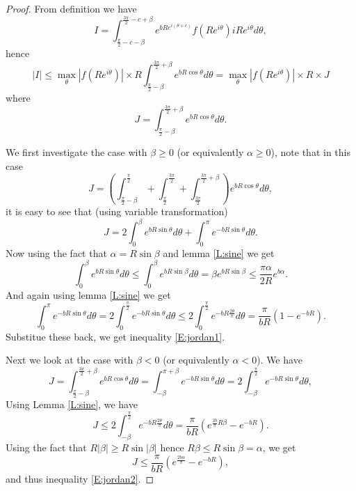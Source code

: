\begin{proof}
From definition we have
\[
  I=\int_{\frac{\pi}{2}-c-\beta}^{\frac{3\pi}{2}-c+\beta}
    e^{bRe^{i(\theta+c)}} f(Re^{i\theta}) iRe^{i\theta} d\theta,
\]
hence
\[
  |I| \le \max_{\theta}|f(Re^{i\theta})| \times R
          \int_{\frac{\pi}{2}-\beta}^{\frac{3\pi}{2}+\beta}
            e^{bR\cos{\theta}} d\theta
      = \max_{\theta}|f(Re^{i\theta})| \times R \times J
\]
where 
\[
  J= \int_{\frac{\pi}{2}-\beta}^{\frac{3\pi}{2}+\beta}
       e^{bR\cos{\theta}} d\theta.
\]

We first investigate the case with $\beta\ge0$ (or equivalently
$\alpha\ge 0$), note that in this case
\[
  J=\left( 
      \int_{\frac{\pi}{2}-\beta}^{\frac{\pi}{2}}
      + \int_{\frac{\pi}{2}}^{\frac{3\pi}{2}}
      + \int_{\frac{3\pi}{2}}^{\frac{3\pi}{2}+\beta}
    \right)
    e^{bR\cos{\theta}} d\theta,
\]
it is easy to see that (using variable transformation)
\[
  J= 2\int_0^{\beta} e^{bR\sin{\theta}} d\theta
      + \int_0^{\pi} e^{-bR\sin{\theta}} d\theta.
\]
Now using the fact that $\alpha=R\sin{\beta}$ and lemma \ref{L:sine} we get
\[
  \int_0^{\beta} e^{bR\sin{\theta}} d\theta
  \le \int_0^{\beta} e^{bR\sin{\beta}} d\theta
  = \beta e^{bR\sin{\beta}} \le \frac{\pi\alpha}{2R} e^{b\alpha}.
\]
And again using lemma \ref{L:sine} we get
\[
  \int_0^{\pi} e^{-bR\sin{\theta}} d\theta
  = 2\int_0^{\frac{\pi}{2}} e^{-bR\sin{\theta}} d\theta
  \le 2\int_0^{\frac{\pi}{2}} e^{-bR\frac{2\theta}{\pi}} d\theta
  = \frac{\pi}{bR} (1-e^{-bR}).
\]
Substitue these back, we get inequality \ref{E:jordan1}.

Next we look at the case with $\beta<0$ (or equivalently $\alpha<0$). We have
\[
  J= \int_{\frac{\pi}{2}-\beta}^{\frac{3\pi}{2}+\beta}
       e^{bR\cos{\theta}} d\theta
   = \int_{-\beta}^{\pi+\beta} e^{-bR\sin{\theta}} d\theta
   = 2 \int_{-\beta}^{\frac{\pi}{2}} e^{-bR\sin{\theta}} d\theta,
\]
Using Lemma \ref{L:sine}, we have
\[
  J \le 2 \int_{-\beta}^{\frac{\pi}{2}} e^{-bR\frac{2\theta}{\pi}} d\theta
    = \frac{\pi}{bR}\left( e^{\frac{2b}{\pi} R\beta} - e^{-bR} \right).
\]
Using the fact that $R|\beta|\ge R\sin{|\beta|}$ hence 
$R\beta\le R\sin{\beta}=\alpha$, we get
\[
  J \le \frac{\pi}{bR}\left( e^{\frac{2b\alpha}{\pi}} - e^{-bR} \right),
\]
and thus inequality \ref{E:jordan2}.
\end{proof}

